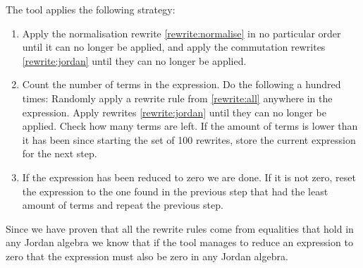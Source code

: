 \documentclass{article}
\begin{document}
The tool applies the following strategy:
\begin{enumerate}
    \item Apply the normalisation rewrite \eqref{rewrite:normalise} in no particular order until it can no longer be applied, and apply the commutation rewrites \eqref{rewrite:jordan} until they can no longer be applied.
    \item Count the number of terms in the expression. Do the following a hundred times: Randomly apply a rewrite rule from \eqref{rewrite:all} anywhere in the expression. Apply rewrites \eqref{rewrite:jordan} until they can no longer be applied. Check how many terms are left. If the amount of terms is lower than it has been since starting the set of 100 rewrites, store the current expression for the next step.
    \item If the expression has been reduced to zero we are done. If it is not zero, reset the expression to the one found in the previous step that had the least amount of terms and repeat the previous step.
\end{enumerate}

Since we have proven that all the rewrite rules come from equalities that hold in any Jordan algebra we know that if the tool manages to reduce an expression to zero that the expression must also be zero in any Jordan algebra.
\end{document}
